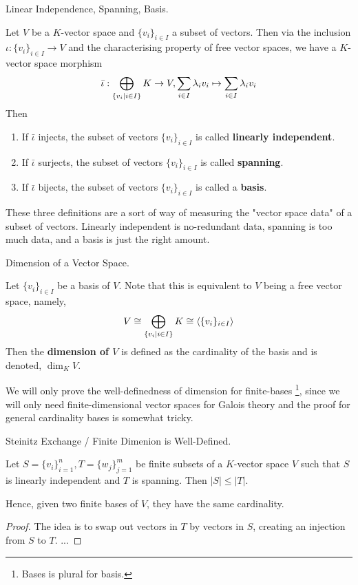\documentclass[../book.tex]{subfiles}
\begin{document}
\begin{dfn} Linear Independence, Spanning, Basis.
    
    Let $V$ be a $K$-vector space and $\{v_i\}_{i\in I}$ a subset of vectors.
    Then via the inclusion $\iota : \{v_i\}_{i\in I} \to V$ and
    the characterising property of free vector spaces, 
    we have a $K$-vector space morphism \[
        \bar\iota : \bigoplus_{\{v_i \mid i\in I\}} K \to V, 
        \sum_{i\in I}\lambda_i v_i \mapsto \sum_{i\in I}\lambda_i v_i
    \]
    Then \begin{enumerate}
        \item If $\bar\iota$ injects,
        the subset of vectors $\{v_i\}_{i\in I}$ 
        is called \textbf{linearly independent}. 
        \item If $\bar\iota$ surjects, 
        the subset of vectors $\{v_i\}_{i\in I}$ is called \textbf{spanning}.
        \item If $\bar\iota$ bijects,
        the subset of vectors $\{v_i\}_{i\in I}$ is called a \textbf{basis}.
    \end{enumerate}
    
    These three definitions are a sort of way of measuring the 
    "vector space data" of a subset of vectors.
    Linearly independent is no-redundant data, spanning is too much data, and
    a basis is just the right amount. 
\end{dfn}

\begin{dfn} Dimension of a Vector Space.

    Let $\{v_i\}_{i\in I}$ be a basis of $V$. 
    Note that this is equivalent to $V$ being a free vector space, namely, 
    \[
        V \cong \bigoplus_{\{v_i \mid i\in I\}} K \cong \langle\{v_i\}_{i\in I}\rangle 
    \]
    Then the \textbf{dimension of $V$} is defined as the cardinality of the basis
    and is denoted, $\dim_K V$. 
    
    We will only prove the well-definedness of dimension for finite-bases
    \footnote{Bases is plural for basis.}, 
    since we will only need finite-dimensional vector spaces for Galois theory
    and the proof for general cardinality bases is somewhat tricky. 
\end{dfn}
\begin{lem} Steinitz Exchange / Finite Dimenion is Well-Defined. 

    Let $S = \{v_i\}_{i=1}^n, T = \{w_j\}_{j=1}^m$ be finite subsets 
    of a $K$-vector space $V$ such that 
    $S$ is linearly independent and $T$ is spanning. 
    Then $|S| \leq |T|$.
    
    Hence, given two finite bases of $V$, they have the same cardinality. 
\end{lem}
\begin{proof}
    The idea is to swap out vectors in $T$ by vectors in $S$, 
    creating an injection from $S$ to $T$. 
    ...
\end{proof}
\end{document}
